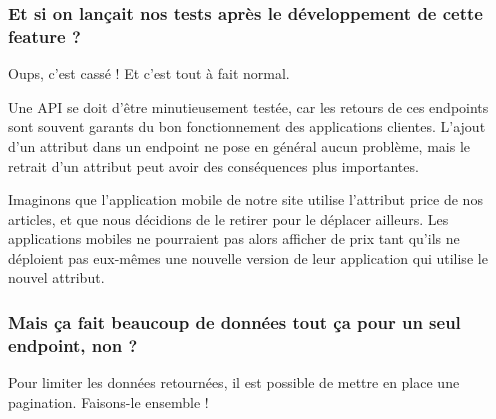 \documentclass[a4paper]{article}
\begin{document}
\subsubsection*{Et si on lançait nos tests après le développement de cette feature ?}
Oups, c’est cassé ! Et c’est tout à fait {\color{monOrange}normal}.

Une API se doit d’être minutieusement {\color{monOrange}testée}, car les retours de ces endpoints sont souvent garants du bon fonctionnement des applications clientes. L’ajout d’un attribut dans un endpoint ne pose en général aucun problème, mais le {\color{monOrange}retrait} d’un attribut peut avoir des conséquences plus importantes.

Imaginons que l’application mobile de notre site utilise l’attribut price  de nos articles, et que nous décidions de le {\color{monOrange}retirer} pour le déplacer ailleurs. Les applications mobiles ne pourraient pas alors afficher de prix tant qu’ils ne déploient pas eux-mêmes une nouvelle version de leur application qui utilise le {\color{monOrange}nouvel attribut}.

\subsubsection*{Mais ça fait beaucoup de données tout ça pour un seul endpoint, non ?}
Pour limiter les données retournées, il est possible de mettre en place une {\color{monOrange}pagination}. Faisons-le ensemble !
\end{document}
